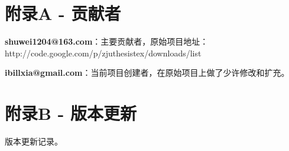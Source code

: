 \chapter{附录A - 贡献者}

\textbf{shuwei1204@163.com}：主要贡献者，原始项目地址： \\
http://code.google.com/p/zjuthesistex/downloads/list 

\textbf{ibillxia@gmail.com}：当前项目创建者，在原始项目上做了少许修改和扩充。

\chapter{附录B - 版本更新}
版本更新记录。

